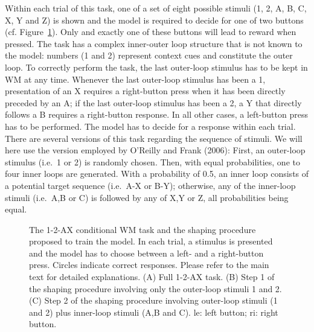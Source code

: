 \documentclass[
  11pt,
  a4paper,
]{scrbook}
\begin{document}
Within each trial of this task, one of a set of eight possible stimuli
(1, 2, A, B, C, X, Y and Z) is shown and the model is required to decide
for one of two buttons (cf. Figure~\ref{fig-nn:fig3}). Only and exactly
one of these buttons will lead to reward when pressed. The task has a
complex inner-outer loop structure that is not known to the model:
numbers (1 and 2) represent context cues and constitute the outer loop.
To correctly perform the task, the last outer-loop stimulus has to be
kept in WM at any time. Whenever the last outer-loop stimulus has been a
1, presentation of an X requires a right-button press when it has been
directly preceded by an A; if the last outer-loop stimulus has been a 2,
a Y that directly follows a B requires a right-button response. In all
other cases, a left-button press has to be performed. The model has to
decide for a response within each trial. There are several versions of
this task regarding the sequence of stimuli. We will here use the
version employed by O'Reilly and Frank (2006): First, an outer-loop
stimulus (i.e.~1 or 2) is randomly chosen. Then, with equal
probabilities, one to four inner loops are generated. With a probability
of 0.5, an inner loop consists of a potential target sequence (i.e.~A-X
or B-Y); otherwise, any of the inner-loop stimuli (i.e.~A,B or C) is
followed by any of X,Y or Z, all probabilities being equal.

\begin{figure}


\caption{\label{fig-nn:fig3}The 1-2-AX conditional WM task and the
shaping procedure proposed to train the model. In each trial, a stimulus
is presented and the model has to choose between a left- and a
right-button press. Circles indicate correct responses. Please refer to
the main text for detailed explanations. (A) Full 1-2-AX task. (B) Step
1 of the shaping procedure involving only the outer-loop stimuli 1 and
2. (C) Step 2 of the shaping procedure involving outer-loop stimuli (1
and 2) plus inner-loop stimuli (A,B and C). le: left button; ri: right
button.}

\end{figure}%
\end{document}
